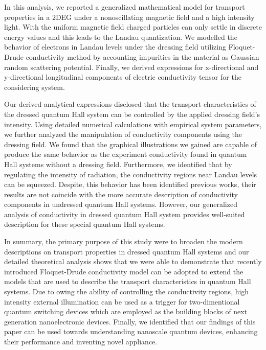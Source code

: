 In this analysis, we reported a generalized mathematical model for transport properties in a 2DEG under a nonoscillating magnetic field and a high intensity light. With the uniform magnetic field charged particles can only settle in discrete energy values and this leads to the Landau quantization. We modelled the behavior of electrons in Landau levels under the dressing field utilizing Floquet-Drude conductivity method by accounting impurities in the material as Gaussian random scattering potential. Finally, we derived expressions for x-directional and y-directional longitudinal components of electric conductivity tensor for the considering system.

Our derived analytical expressions disclosed that the transport characteristics of the dressed quantum Hall system can be controlled by the applied dressing field’s intensity. Using detailed numerical calculations with empirical system parameters, we further analyzed the manipulation of conductivity components using the dressing field. We found that the graphical illustrations we gained are capable of produce the same behavior as the experiment conductivity found in quantum Hall systems without a dressing field. Furthermore, we identified that by regulating the intensity of radiation, the conductivity regions near Landau levels can be squeezed. Despite, this behavior has been identified previous works, their results are not coincide with the more accurate description of conductivity components in undressed quantum Hall systems. However, our generalized analysis of conductivity in dressed quantum Hall system provides well-suited description for  these special quantum Hall systems.

In summary, the primary purpose of this study were to broaden the modern descriptions on transport properties in dressed quantum Hall systems and our  detailed theoretical analysis shows that we were able to demonstrate that recently introduced Floquet-Drude conductivity model can be adopted to extend the models that are used to describe the transport characteristics in quantum Hall systems. Due to owing the ability of controlling the conductivity regions, high intensity external illumination can be used as a trigger for two-dimentional quantum switching devices which are employed as the building blocks of next generation nanoelectronic devices. Finally, we identified that our findings of this paper can be used towards understanding nanoscale quantum devices, enhancing their performance and inventing novel appliance.
